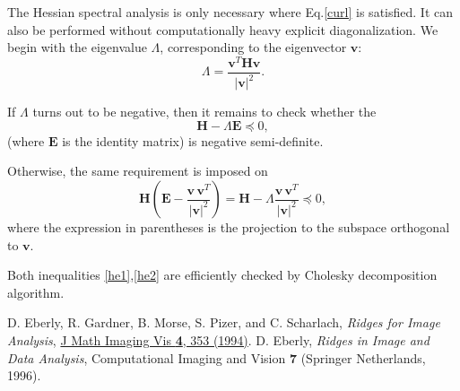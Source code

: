 \documentclass{article}
\begin{document}
The Hessian spectral analysis is only necessary where Eq.\eqref{curl} is satisfied. It can also be performed without computationally heavy explicit diagonalization. We begin with the eigenvalue $\Lambda$, corresponding to the eigenvector $\mathbf{v}$:
\begin{equation}
\Lambda = \frac{\mathbf{v}^T\boldsymbol{H} \mathbf{v}}{\left|\mathbf{v}\right|^2}.
\end{equation}

If $\Lambda$ turns out to be negative, then it remains to check whether the 
\begin{equation}
\label{he1}
\boldsymbol{H} -\Lambda \boldsymbol{E} \preceq 0,
\end{equation}
(where $\boldsymbol{E}$ is the identity matrix) is negative semi-definite. 

Otherwise, the same requirement is imposed on
\begin{equation}
\label{he2}
\boldsymbol{H}\left(\boldsymbol{E} - \frac{\mathbf{v}\,\mathbf{v}^T}{\left|\mathbf{v}\right|^2}\right)=
\boldsymbol{H} - \Lambda \frac{\mathbf{v}\,\mathbf{v}^T}{\left|\mathbf{v}\right|^2}
\preceq 0,
\end{equation}
where the expression in parentheses is the projection to the subspace orthogonal to $\mathbf{v}$.

Both inequalities \eqref{he1},\eqref{he2} are efficiently checked by Cholesky decomposition algorithm.

\begin{thebibliography}{9}
D. Eberly, R. Gardner, B. Morse, S. Pizer, and C. Scharlach,
\textit{Ridges for Image Analysis},
\href{https://doi.org/10.1007/BF01262402}{J Math Imaging Vis \textbf{4}, 353 (1994)}.
D. Eberly,
\textit{Ridges in Image and Data Analysis},
Computational Imaging and Vision \textbf{7} (Springer Netherlands, 1996).
\end{thebibliography}
\end{document}
